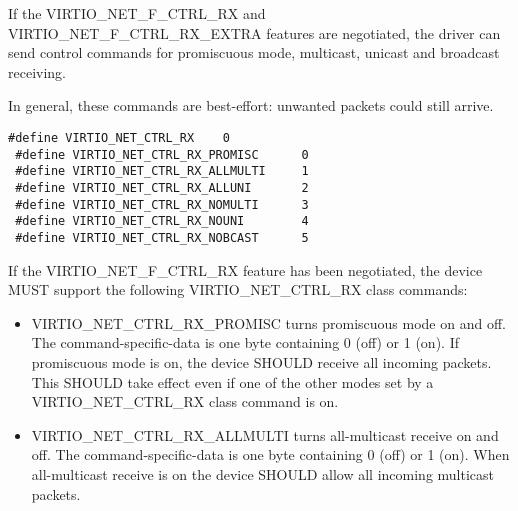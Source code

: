 If the VIRTIO_NET_F_CTRL_RX and VIRTIO_NET_F_CTRL_RX_EXTRA
features are negotiated, the driver can send control commands for
promiscuous mode, multicast, unicast and broadcast receiving.

\begin{note}
In general, these commands are best-effort: unwanted
packets could still arrive.
\end{note}

\begin{lstlisting}
#define VIRTIO_NET_CTRL_RX    0
 #define VIRTIO_NET_CTRL_RX_PROMISC      0
 #define VIRTIO_NET_CTRL_RX_ALLMULTI     1
 #define VIRTIO_NET_CTRL_RX_ALLUNI       2
 #define VIRTIO_NET_CTRL_RX_NOMULTI      3
 #define VIRTIO_NET_CTRL_RX_NOUNI        4
 #define VIRTIO_NET_CTRL_RX_NOBCAST      5
\end{lstlisting}



If the VIRTIO_NET_F_CTRL_RX feature has been negotiated,
the device MUST support the following VIRTIO_NET_CTRL_RX class
commands:
\begin{itemize}
\item VIRTIO_NET_CTRL_RX_PROMISC turns promiscuous mode on and
off. The command-specific-data is one byte containing 0 (off) or
1 (on). If promiscuous mode is on, the device SHOULD receive all
incoming packets.
This SHOULD take effect even if one of the other modes set by
a VIRTIO_NET_CTRL_RX class command is on.
\item VIRTIO_NET_CTRL_RX_ALLMULTI turns all-multicast receive on and
off. The command-specific-data is one byte containing 0 (off) or
1 (on). When all-multicast receive is on the device SHOULD allow
all incoming multicast packets.
\end{itemize}

